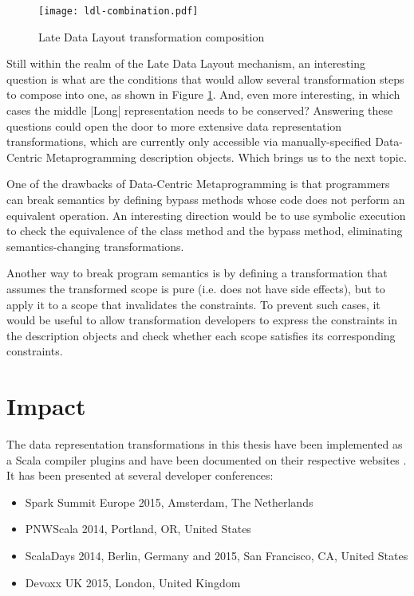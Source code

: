 \begin{figure}[h!]
  \centering
  \vspace{0.6em}
  \texttt{[image: ldl-combination.pdf]}
  \caption{Late Data Layout transformation composition}
  \label{fig:ldl-composition}
  \vspace{-0.6em}
\end{figure}

Still within the realm of the Late Data Layout mechanism, an interesting question is what are the conditions that would allow several transformation steps to compose into one, as shown in Figure \ref{fig:ldl-composition}. And, even more interesting, in which cases the middle |Long| representation needs to be conserved? Answering these questions could open the door to more extensive data representation transformations, which are currently only accessible via manually-specified Data-Centric Metaprogramming description objects. Which brings us to the next topic.

One of the drawbacks of Data-Centric Metaprogramming is that programmers can break semantics by defining bypass methods whose code does not perform an equivalent operation.  An interesting direction would be to use symbolic execution to check the equivalence of the class method and the bypass method, eliminating semantics-changing transformations.

Another way to break program semantics is by defining a transformation that assumes the transformed scope is pure (i.e. does not have side effects), but to apply it to a scope that invalidates the constraints. To prevent such cases, it would be useful to allow transformation developers to express the constraints in the description objects and check whether each scope satisfies its corresponding constraints.


\section{Impact}

The data representation transformations in this thesis have been implemented as a Scala compiler plugins and have been documented on their respective websites \cite{miniboxing-www,ildl-www,ldl-www}. It has been presented at several developer conferences:

\begin{itemize}
  \item Spark Summit Europe 2015, Amsterdam, The Netherlands
  \item PNWScala 2014, Portland, OR, United States
  \item ScalaDays 2014, Berlin, Germany and 2015, San Francisco, CA, United States
  \item Devoxx UK 2015, London, United Kingdom
\end{itemize}


